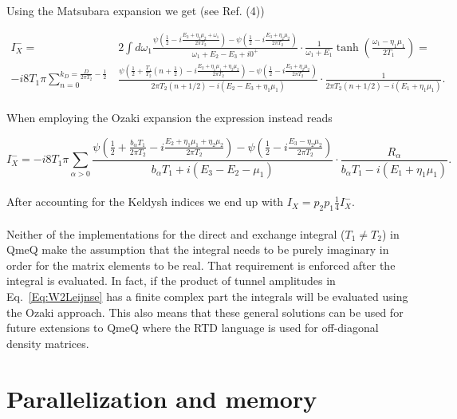 \documentclass{article}
\begin{document}
Using the Matsubara expansion we get (see Ref. (4))

\begin{equation}
\begin{split}
    I_X^-=&2\int d\omega_1 \frac{\psi\left( \frac{1}{2}-i\frac{E_2+\eta_2\mu_2+\omega_1}{2\pi T_2}\right)-\psi\left( \frac{1}{2}-i\frac{E_3+\eta_2\mu_2}{2\pi T_2}\right)}{\omega_1 + E_2-E_3+i0^+}\cdot\frac{1}{\omega_1+E_1}\tanh\left(\frac{\omega_1-\eta_1\mu_1}{2T_1} \right) = \\ 
    -i8T_1\pi\sum_{n=0}^{k_D=\frac{D}{2\pi T_2}-\frac{1}{2}}&\frac{\psi\left ( \frac{1}{2}+\frac{T_1}{T_2}\left(n+\frac{1}{2} \right)-i\frac{E_2+\eta_1\mu_1+\eta_2\mu_2}{2\pi T_2} \right ) - \psi\left( \frac{1}{2} -i\frac{E_3+\eta_2\mu_2}{2\pi T_2} \right )}{2\pi T_2(n+1/2)-i(E_2-E_3+\eta_1\mu_1)}\cdot\frac{1}{2\pi T_2 (n+1/2)-i(E_1+\eta_1\mu_1)}.
    \end{split}
\end{equation}
\\
When employing the Ozaki expansion the expression instead reads

\begin{equation}
I_X^- =-i8T_1\pi\sum_{\alpha>0} \frac{\psi\left ( \frac{1}{2} + \frac{b_\alpha T_1}{2\pi T_2}-i\frac{E_2+\eta_1\mu_1+ \eta_2\mu_2}{2\pi T_2} \right ) - \psi\left ( \frac{1}{2} - i\frac{E_3-\eta_2\mu_2}{2\pi T_2}\right ) }{b_\alpha T_1 + i(E_3-E_2-\mu_1)}\cdot\frac{R_\alpha}{b_\alpha T_1 - i(E_1+\eta_1\mu_1)}.
\end{equation}
\\
After accounting for the Keldysh indices we end up with $I_X = p_2p_1\frac{1}{4}I_X^-$.
\\
\\
Neither of the implementations for the direct and exchange integral ($T_1\ne T_2$) in QmeQ make the assumption that the integral needs to be purely imaginary in order for the matrix elements to be real. That requirement is enforced after the integral is evaluated. In fact, if the product of tunnel amplitudes in Eq.~\ref{Eq:W2Leijnse} has a finite complex part the integrals will be evaluated using the Ozaki approach. This also means that these general solutions can be used for future extensions to QmeQ where the RTD language is used for off-diagonal density matrices.
\section{Parallelization and memory}
\end{document}
